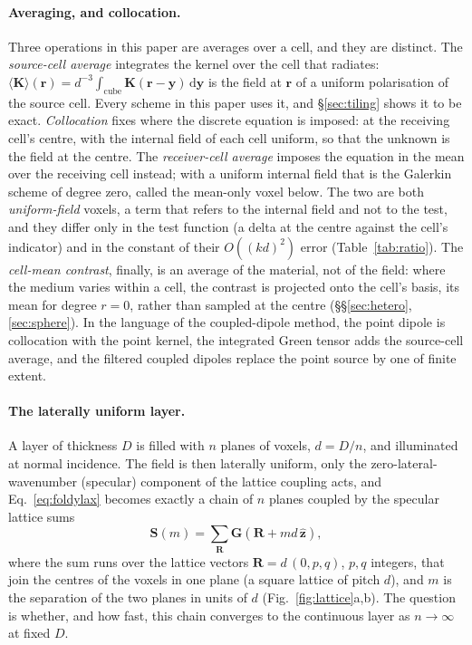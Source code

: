 \documentclass[11pt,a4paper]{article}
\newcommand{\bK}{\mathbf{K}}
\newcommand{\bS}{\mathbf{S}}
\newcommand{\bG}{\mathbf{G}}
\newcommand{\dd}{\mathrm{d}}
\begin{document}
\paragraph{Averaging, and collocation.} Three operations in this paper are averages over a cell,
and they are distinct. The \emph{source-cell average} integrates the kernel over the cell that
radiates: $\langle\bK\rangle(\mathbf r)=d^{-3}\int_{\text{cube}}\bK(\mathbf r-\mathbf y)\,\dd\mathbf y$
is the field at $\mathbf r$ of a uniform polarisation of the source cell. Every scheme in this paper
uses it, and \S\ref{sec:tiling} shows it to be exact. \emph{Collocation} fixes where the discrete
equation is imposed: at the receiving cell's centre, with the internal field of each cell uniform, so
that the unknown is the field at the centre. The \emph{receiver-cell average} imposes the equation in
the mean over the receiving cell instead; with a uniform internal field that is the Galerkin scheme
of degree zero, called the mean-only voxel below. The two are both \emph{uniform-field} voxels, a
term that refers to the internal field and not to the test, and they differ only in the test
function (a delta at the centre against the cell's indicator) and in the constant of their
$O((kd)^2)$ error (Table~\ref{tab:ratio}). The \emph{cell-mean contrast}, finally, is an average of
the material, not of the field: where the medium varies within a cell, the contrast is projected
onto the cell's basis, its mean for degree $r=0$, rather than sampled at the centre
(\S\S\ref{sec:hetero}, \ref{sec:sphere}). In the language of the coupled-dipole method, the point
dipole is collocation with the point kernel, the integrated Green tensor adds the source-cell
average, and the filtered coupled dipoles replace the point source by one of finite extent.

\paragraph{The laterally uniform layer.} A layer of thickness $D$ is filled with $n$ planes of
voxels, $d=D/n$, and illuminated at normal incidence. The field is then laterally uniform, only the
zero-lateral-wavenumber (specular) component of the lattice coupling acts, and
Eq.~\eqref{eq:foldylax} becomes exactly a chain of $n$ planes coupled by the specular lattice sums
\begin{equation}\label{eq:specsum}
  \bS(m)=\sum_{\mathbf R}\bG(\mathbf R+m d\,\hat{\mathbf z}),
\end{equation}
where the sum runs over the lattice vectors $\mathbf R=d\,(0,p,q)$, $p,q$ integers, that join the centres of
the voxels in one plane (a square lattice of pitch $d$), and $m$ is the separation of the two planes in
units of $d$ (Fig.~\ref{fig:lattice}a,b). The question is whether, and how fast, this chain converges to the
continuous layer as $n\to\infty$ at fixed $D$.
\end{document}
